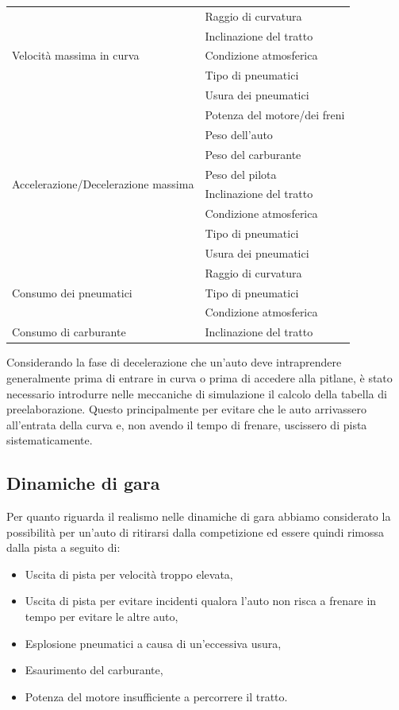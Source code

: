 \documentclass[11pt,a4paper]{report}
\begin{document}
\begin{center}
\begin{tabular}{|l|l|}
\hline
\multirow{5}{*}{Velocità massima in curva} & Raggio di curvatura\\
& Inclinazione del tratto\\
& Condizione atmosferica\\
& Tipo di pneumatici\\
& Usura dei pneumatici\\
\hline
\multirow{8}{*}{Accelerazione/Decelerazione massima} & Potenza del motore/dei freni\\
& Peso dell'auto\\
& Peso del carburante\\
& Peso del pilota\\
& Inclinazione del tratto\\
& Condizione atmosferica\\
& Tipo di pneumatici\\
& Usura dei pneumatici\\
\hline
\multirow{3}{*}{Consumo dei pneumatici} & Raggio di curvatura\\
& Tipo di pneumatici\\
& Condizione atmosferica\\
\hline
Consumo di carburante & Inclinazione del tratto\\
\hline
\end{tabular}
\end{center}

Considerando la fase di decelerazione che un'auto deve intraprendere generalmente prima di entrare in curva o prima di accedere alla pitlane, è stato necessario introdurre nelle meccaniche di simulazione il calcolo della tabella di preelaborazione.
Questo principalmente per evitare che le auto arrivassero all'entrata della curva e, non avendo il tempo di frenare, uscissero di pista sistematicamente.
\subsection*{Dinamiche di gara}
Per quanto riguarda il realismo nelle dinamiche di gara abbiamo considerato la possibilità per un'auto di ritirarsi dalla competizione ed essere quindi rimossa dalla pista a seguito di:
\begin{itemize}
\item Uscita di pista per velocità troppo elevata,
\item Uscita di pista per evitare incidenti qualora l'auto non risca a frenare in tempo per evitare le altre auto,
\item Esplosione pneumatici a causa di un'eccessiva usura,
\item Esaurimento del carburante,
\item Potenza del motore insufficiente a percorrere il tratto.
\end{itemize}
\end{document}
